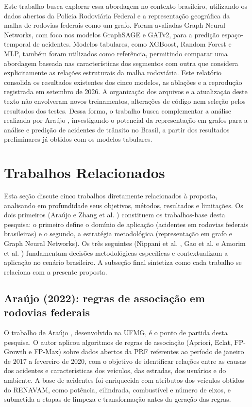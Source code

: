 \documentclass[12pt]{article}
\begin{document}
Este trabalho busca explorar essa abordagem no contexto brasileiro,
utilizando os dados abertos da Polícia Rodoviária Federal e a
representação geográfica da malha de rodovias federais como um grafo.
Foram avaliadas Graph Neural Networks, com foco nos modelos GraphSAGE
e GATv2, para a predição espaço-temporal de acidentes. Modelos
tabulares, como XGBoost, Random Forest e MLP, também foram utilizados
como referência, permitindo comparar uma abordagem baseada nas
características dos segmentos com outra que considera
explicitamente as relações estruturais da malha rodoviária. Este
relatório consolida os resultados existentes dos cinco modelos, as
ablações e a reprodução registrada em setembro de 2026. A organização
dos arquivos e a atualização deste texto não envolveram novos
treinamentos, alterações de código nem seleção pelos resultados dos
testes. Dessa forma, o trabalho
busca complementar a análise realizada por Araújo \cite{araujo2022},
investigando o potencial da representação em grafos para a análise e
predição de acidentes de trânsito no Brasil, a partir dos resultados
preliminares já obtidos com os modelos tabulares.



\section{Trabalhos Relacionados}
Esta seção discute cinco trabalhos diretamente relacionados à proposta,
analisando em profundidade seus objetivos, métodos, resultados e
limitações. Os dois primeiros (Araújo \cite{araujo2022} e Zhang et
al. \cite{zhang2026}) constituem os trabalhos-base desta pesquisa: o
primeiro define o domínio de aplicação (acidentes em rodovias federais
brasileiras) e o segundo, a estratégia metodológica (representação em
grafo e Graph Neural Networks). Os três seguintes (Nippani et al.
\cite{nippani2023}, Gao et al. \cite{zhuang2024} e Amorim et al.
\cite{amorim2023}) fundamentam decisões metodológicas específicas e
contextualizam a aplicação no cenário brasileiro. A subseção final
sintetiza como cada trabalho se relaciona com a presente proposta.

\subsection{Araújo (2022): regras de associação em rodovias federais}

O trabalho de Araújo \cite{araujo2022}, desenvolvido na UFMG, é o ponto
de partida desta pesquisa. O autor aplicou algoritmos de regras de
associação (Apriori, Eclat, FP-Growth e FP-Max) sobre dados
abertos da PRF referentes ao período de janeiro de 2017 a fevereiro de
2020, com o objetivo de identificar relações entre as causas dos
acidentes e características dos veículos, das estradas, dos usuários e
do ambiente. A base de acidentes foi enriquecida com atributos dos
veículos obtidos do RENAVAM, como potência, cilindrada, combustível e
número de eixos, e submetida a etapas de limpeza e transformação antes
da geração das regras.
\end{document}
